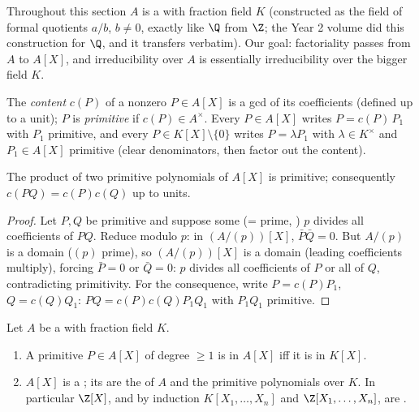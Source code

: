 Throughout this section $A$ is a  with fraction field $K$
(constructed as the field of formal quotients $a/b$, $b \neq 0$,
exactly like $\Q$ from $\Z$; the Year 2 volume did this
construction for $\Q$, and it transfers verbatim). Our goal:
factoriality passes from $A$ to $A[X]$, and irreducibility over
$A$ is essentially irreducibility over the bigger field $K$.

\begin{definition}\label{def:b3:rings:content}
The \emph{content} $c(P)$ of a
nonzero $P \in A[X]$ is a gcd of its coefficients (defined up to a
unit); $P$ is \emph{primitive} if $c(P) \in A^\times$. Every $P
\in A[X]$ writes $P = c(P)\,P_1$ with $P_1$ primitive, and every
$P \in K[X]\setminus\{0\}$ writes $P = \lambda P_1$ with $\lambda
\in K^\times$ and $P_1 \in A[X]$ primitive (clear denominators,
then factor out the content).
\end{definition}

\begin{lemma}[Gauss]\label{lem:b3:rings:gauss}
The product of two primitive polynomials of $A[X]$ is primitive;
consequently $c(PQ) = c(P)c(Q)$ up to units.
\end{lemma}

\begin{proof}
Let $P, Q$ be primitive and suppose some  (= prime,
) $p$ divides all coefficients of $PQ$. Reduce modulo $p$: in
$(A/(p))[X]$, $\bar P \bar Q = 0$. But $A/(p)$ is a domain
($(p)$ prime), so $(A/(p))[X]$ is a domain (leading coefficients
multiply), forcing $\bar P = 0$ or $\bar Q = 0$: $p$ divides all
coefficients of $P$ or all of $Q$, contradicting primitivity. For
the consequence, write $P = c(P)P_1$, $Q = c(Q)Q_1$: $PQ =
c(P)c(Q) P_1Q_1$ with $P_1Q_1$ primitive.
\end{proof}

\begin{theorem}\label{thm:b3:rings:gaussufd}
Let $A$ be a  with fraction field $K$.
\begin{enumerate}
  \item A primitive $P \in A[X]$ of degree $\geq 1$ is 
        in $A[X]$ iff it is  in $K[X]$.
  \item $A[X]$ is a ; its  are the  of
        $A$ and the primitive polynomials  over $K$. In
        particular $\Z[X]$, and by induction $K[X_1, \dots, X_n]$
        and $\Z[X_1, \dots, X_n]$, are .
\end{enumerate}
\end{theorem}


